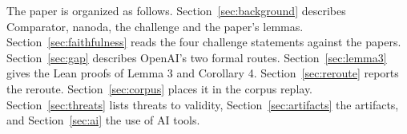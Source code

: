 The paper is organized as follows. %
Section~\ref{sec:background} describes Comparator, nanoda, the challenge and the paper's lemmas. %
Section~\ref{sec:faithfulness} reads the four challenge statements against the papers. %
Section~\ref{sec:gap} describes OpenAI's two formal routes. %
Section~\ref{sec:lemma3} gives the Lean proofs of Lemma 3 and Corollary 4. %
Section~\ref{sec:reroute} reports the reroute. %
Section~\ref{sec:corpus} places it in the corpus replay. %
Section~\ref{sec:threats} lists threats to validity, Section~\ref{sec:artifacts} the artifacts, and Section~\ref{sec:ai} the use of AI tools. %
